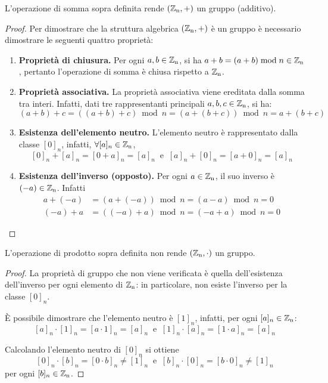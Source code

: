 \begin{proposizione}
L'operazione di somma sopra definita rende $(\operatorname*{\mathbb{Z}_n}, +)$ un gruppo (additivo).
\end{proposizione}
\begin{proof}
Per dimostrare che la struttura algebrica $(\operatorname*{\mathbb{Z}_n}, +)$ è un gruppo è necessario dimostrare le seguenti quattro proprietà:
\begin{enumerate}
\item \textbf{Proprietà di chiusura.} Per ogni $a,b\in\operatorname*{\mathbb{Z}_n}$, si ha $a+b=(a+b)\bmod n \in\operatorname*{\mathbb{Z}_n}$, pertanto l'operazione di somma è chiusa rispetto a $\operatorname*{\mathbb{Z}_n}$.
\item \textbf{Proprietà associativa.} La proprietà associativa viene ereditata dalla somma tra interi. Infatti, dati tre rappresentanti principali $a,b,c\in\operatorname*{\mathbb{Z}_n}$, si ha:
\[
(a+b)+c=((a+b)+c)\bmod n=(a+(b+c))\bmod n = a+(b+c)
\]
\item \textbf{Esistenza dell'elemento neutro.} L'elemento neutro è rappresentato dalla classe $[0]_n$, infatti, $\forall [a]_n\in\operatorname*{\mathbb{Z}_n}$,
\[
[0]_n+[a]_n=[0+a]_n=[a]_n \ \mbox{ e } \ [a]_n+[0]_n=[a+0]_n=[a]_n
\]
\item \textbf{Esistenza dell'inverso (opposto).} Per ogni $a\in\operatorname*{\mathbb{Z}_n}$, il suo inverso è $(-a)\in\operatorname*{\mathbb{Z}_n}$. Infatti
\begin{align*}
a+(-a)&=(a+(-a))\bmod n=(a-a)\bmod n=0 \\
(-a)+a&=((-a)+a)\bmod n=(-a+a)\bmod n=0
\end{align*}
\end{enumerate}
\end{proof}

\begin{proposizione}
L'operazione di prodotto sopra definita non rende $(\operatorname*{\mathbb{Z}_n}, \cdot)$ un gruppo.
\end{proposizione}
\begin{proof}
La proprietà di gruppo che non viene verificata è quella dell'esistenza dell'inverso per ogni elemento di $\operatorname*{\mathbb{Z}_n}$: in particolare, non esiste l'inverso per la classe $[0]_n$. 

È possibile dimostrare che l'elemento neutro è $[1]_n$, infatti, per ogni $[a]_n\in\operatorname*{\mathbb{Z}_n}$:
\[
[a]_n \cdot [1]_n = [a\cdot 1]_n = [a]_n \ \mbox{ e } \  [1]_n \cdot [a]_n = [1\cdot a]_n = [a]_n
\]

Calcolando l'elemento neutro di $[0]_n$ si ottiene
\[
[0]_n \cdot [b]_n = [0\cdot b]_n \neq [1]_n \ \mbox{ e } \  [b]_n \cdot [0]_n = [b\cdot 0]_n \neq [1]_n
\]
per ogni $[b]_n\in\operatorname*{\mathbb{Z}_n}$.
\end{proof}

